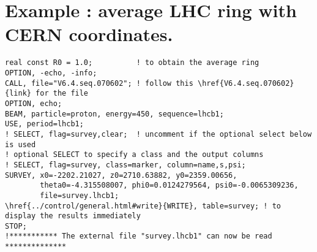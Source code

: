 \section{ Example : average LHC ring with CERN coordinates.}

\begin{verbatim}
real const R0 = 1.0;          ! to obtain the average ring
OPTION, -echo, -info;
CALL, file="V6.4.seq.070602"; ! follow this \href{V6.4.seq.070602}{link} for the file
OPTION, echo;
BEAM, particle=proton, energy=450, sequence=lhcb1;
USE, period=lhcb1;
! SELECT, flag=survey,clear;  ! uncomment if the optional select below is used
! optional SELECT to specify a class and the output columns
! SELECT, flag=survey, class=marker, column=name,s,psi;
SURVEY, x0=-2202.21027, z0=2710.63882, y0=2359.00656,
        theta0=-4.315508007, phi0=0.0124279564, psi0=-0.0065309236,
        file=survey.lhcb1;
\href{../control/general.html#write}{WRITE}, table=survey; ! to display the results immediately
STOP;
!*********** The external file "survey.lhcb1" can now be read **************
\end{verbatim}


